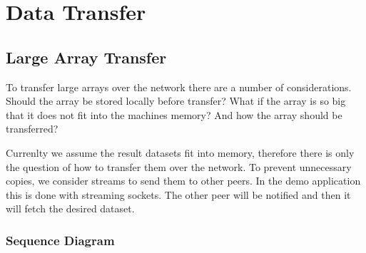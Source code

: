 \chapter{Data Transfer}
\label{cha:data}

\section{Large Array Transfer}
To transfer large arrays over the network there are a number of considerations. Should the array be stored locally before transfer? What if the array is so big that it does not fit into the machines memory? And how the array should be transferred?

Currenlty we assume the result datasets fit into memory, therefore there is only the question of how to transfer them over the network. To prevent unnecessary copies, we consider streams to send them to other peers. In the demo application this is done with streaming sockets. The other peer will be notified and then it will fetch the desired dataset.

\subsection{Sequence Diagram}
